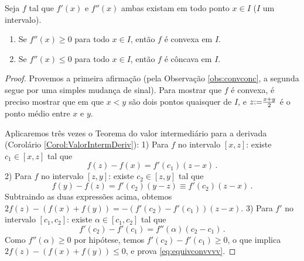 \begin{teo}\label{Teo:Sinalfseconde}
Seja $f$ tal que $f'(x)$ e $f''(x)$ ambas existam em todo ponto $x\in
I$ ($I$ um intervalo).
\begin{enumerate}
 \item Se $f''(x)\geq 0$ para todo $x\in I$, então $f$ é convexa em $I$.
 \item Se $f''(x)\leq 0$ para todo $x\in I$, então $f$ é côncava em $I$.
\end{enumerate}
\end{teo}
\begin{proof}
Provemos a primeira afirmação (pela Observação \ref{obs:convconc}, a
segunda segue por uma simples mudança de sinal).
Para mostrar que $f$ é convexa, é preciso mostrar que
em que 
$x<y$ são dois pontos quaisquer de $I$, e $z{:=} \frac{x+y}{2}$ é o
ponto médio entre $x$ e $y$.
\begin{center}
\begin{bmlimage}\end{bmlimage}
\end{center}
Aplicaremos três vezes o Teorema do valor intermediário para a derivada 
(Corolário \ref{Corol:ValorIntermDeriv}):
1) Para $f$ no intervalo $[x,z]$: existe $c_1\in [x,z]$ tal que 
$$f(z)-f(x)=f'(c_1)(z-x)\,.$$
2) Para $f$ no intervalo $[z,y]$: existe $c_2\in [z,y]$ tal que 
$$f(y)-f(z)=f'(c_2)(y-z)\equiv f'(c_2)(z-x)\,.$$
Subtraindo as duas expressões acima, obtemos
$2f(z)-(f(x)+f(y))=-(f'(c_2)-f'(c_1))(z-x)$.
3) Para $f'$ no intervalo $[c_1,c_2]$: existe $\alpha\in [c_1,c_2]$ tal que
$$f'(c_2)-f'(c_1)=f''(\alpha)(c_2-c_1)\,.$$
Como $f''(\alpha)\geq 0$ por hipótese, temos $f'(c_2)-f'(c_1)\geq 0$, o que
implica $2f(z)-(f(x)+f(y))\leq 0$, e prova \eqref{eq:equivconvvvv}.
\end{proof}

